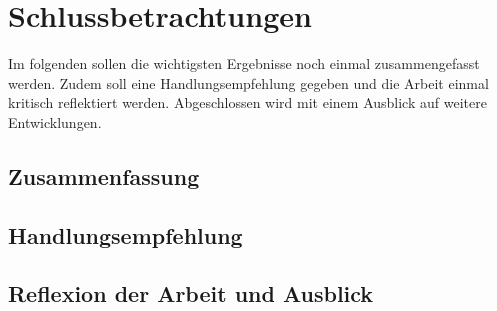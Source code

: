 \chapter{Schlussbetrachtungen}

Im folgenden sollen die wichtigsten Ergebnisse noch einmal zusammengefasst werden. Zudem soll eine Handlungsempfehlung gegeben und die Arbeit einmal kritisch reflektiert werden. Abgeschlossen wird mit einem Ausblick auf weitere Entwicklungen.

\section{Zusammenfassung}



\section{Handlungsempfehlung}



\section{Reflexion der Arbeit und Ausblick}


